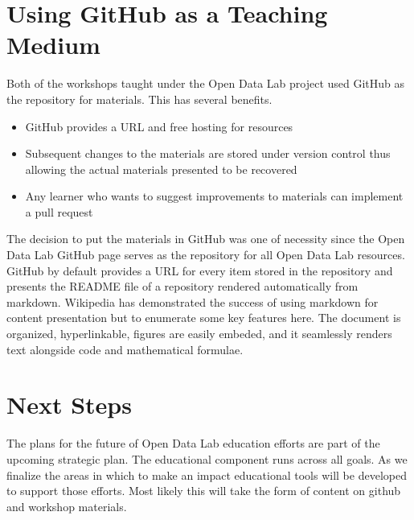 \section{Using GitHub as a Teaching Medium}
\label{githubforteaching}
Both of the workshops taught under the Open Data Lab project used GitHub as the repository for materials. This has several benefits.
\begin{itemize}
\item GitHub provides a URL and free hosting for resources
\item Subsequent changes to the materials are stored under version control thus allowing the actual materials presented to be recovered
\item Any learner who wants to suggest improvements to materials can implement a pull request
\end{itemize}

The decision to put the materials in GitHub was one of necessity since the Open Data Lab GitHub page serves as the repository for all Open Data Lab resources. GitHub by default provides a URL for every item stored in the repository and presents the README file of a repository  rendered automatically from markdown. Wikipedia has demonstrated the success of using markdown for content presentation but to enumerate some key features here. The document is organized, hyperlinkable, figures are easily embeded, and it seamlessly renders text alongside code and mathematical formulae.

\section{Next Steps}
The plans for the future of Open Data Lab education efforts are part of the upcoming strategic plan. The educational component runs across all goals. As we finalize the areas in which to make an impact educational tools will be developed to support those efforts. Most likely this will take the form of content on github and workshop materials.